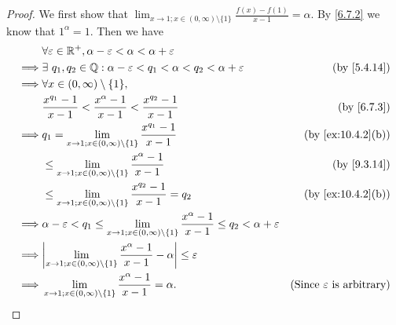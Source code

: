 \begin{proof}
  We first show that \(\lim_{x \to 1 ; x \in (0, \infty) \setminus \{1\}} \frac{f(x) - f(1)}{x - 1} = \alpha\).
  By \cref{6.7.2} we know that \(1^{\alpha} = 1\).
  Then we have
  \begin{align*}
             & \forall \varepsilon \in \R^+, \alpha - \varepsilon < \alpha < \alpha + \varepsilon                                                                                                            \\
    \implies & \exists\ q_1, q_2 \in \Q : \alpha - \varepsilon < q_1 < \alpha < q_2 < \alpha + \varepsilon                                                     & \text{(by \cref{5.4.14})}                   \\
    \implies & \forall x \in (0, \infty) \setminus \{1\},                                                                                                                                                    \\
             & \frac{x^{q_1} - 1}{x - 1} < \frac{x^{\alpha} - 1}{x - 1} < \frac{x^{q_2} - 1}{x - 1}                                                            & \text{(by \cref{6.7.3})}                    \\
    \implies & q_1 = \lim_{x \to 1 ; x \in (0, \infty) \setminus \{1\}} \frac{x^{q_1} - 1}{x - 1}                                                              & \text{(by \cref{ex:10.4.2}(b))}             \\
             & \leq \lim_{x \to 1 ; x \in (0, \infty) \setminus \{1\}} \frac{x^{\alpha} - 1}{x - 1}                                                            & \text{(by \cref{9.3.14})}                   \\
             & \leq \lim_{x \to 1 ; x \in (0, \infty) \setminus \{1\}} \frac{x^{q_2} - 1}{x - 1} = q_2                                                         & \text{(by \cref{ex:10.4.2}(b))}             \\
    \implies & \alpha - \varepsilon < q_1 \leq \lim_{x \to 1 ; x \in (0, \infty) \setminus \{1\}} \frac{x^{\alpha} - 1}{x - 1} \leq q_2 < \alpha + \varepsilon                                               \\
    \implies & \abs{\lim_{x \to 1 ; x \in (0, \infty) \setminus \{1\}} \frac{x^{\alpha} - 1}{x - 1} - \alpha} \leq \varepsilon                                                                               \\
    \implies & \lim_{x \to 1 ; x \in (0, \infty) \setminus \{1\}} \frac{x^{\alpha} - 1}{x - 1} = \alpha.                                                       & \text{(Since \(\varepsilon\) is arbitrary)}
  \end{align*}


\end{proof}
